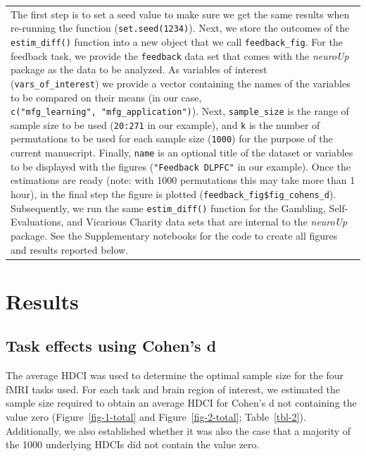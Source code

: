 \documentclass[
  letterpaper,
  DIV=11,
  numbers=noendperiod]{scrartcl}
\begin{document}
\begin{longtable}[]{@{}
  >{\raggedright\arraybackslash}p{}@{}}
\begin{minipage}[t]{\linewidth}
The first step is to set a seed value to make sure we get the same
results when re-running the function (\texttt{set.seed(1234)}). Next, we
store the outcomes of the \texttt{estim\_diff()} function into a new
object that we call \texttt{feedback\_fig}. For the feedback task, we
provide the \texttt{feedback} data set that comes with the
\emph{neuroUp} package as the data to be analyzed. As variables of
interest (\texttt{vars\_of\_interest}) we provide a vector containing
the names of the variables to be compared on their means (in our case,
\texttt{c("mfg\_learning",\ "mfg\_application")}). Next,
\texttt{sample\_size} is the range of sample size to be used
(\texttt{20:271} in our example), and \texttt{k} is the number of
permutations to be used for each sample size (\texttt{1000}) for the
purpose of the current manuscript. Finally, \texttt{name} is an optional
title of the dataset or variables to be displayed with the figures
(\texttt{"Feedback\ DLPFC"} in our example). Once the estimations are
ready (note: with 1000 permutations this may take more than 1 hour), in
the final step the figure is plotted
(\texttt{feedback\_fig\$fig\_cohens\_d}). Subsequently, we run the same
\texttt{estim\_diff()} function for the Gambling, Self-Evaluations, and
Vicarious Charity data sets that are internal to the \emph{neuroUp}
package. See the Supplementary notebooks for the code to create all
figures and results reported below.
\end{minipage} \\
\end{longtable}

\section{Results}\label{results}

\subsection{Task effects using Cohen's
d}\label{task-effects-using-cohens-d}

The average HDCI was used to determine the optimal sample size for the
four fMRI tasks used. For each task and brain region of interest, we
estimated the sample size required to obtain an average HDCI for Cohen's
d not containing the value zero (Figure~\ref{fig-1-total} and
Figure~\ref{fig-2-total}; Table~\ref{tbl-2}). Additionally, we also
established whether it was also the case that a majority of the 1000
underlying HDCIs did not contain the value zero.
\end{document}
